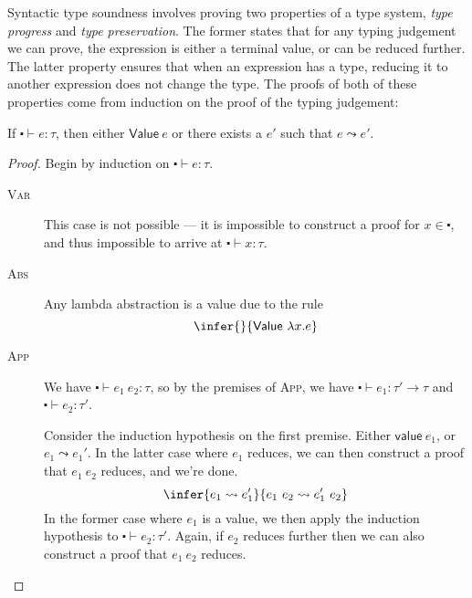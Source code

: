 Syntactic type soundness involves proving two properties of a type
system, \textit{type progress} and \textit{type preservation}.
The former states that for any typing judgement we can prove, the
expression is either a terminal value, or can be reduced further. The
latter property ensures that when an expression has a type, reducing
it to another expression does not change the type.
The proofs of both of these properties come from induction on the
proof of the typing judgement:

\begin{theorem}[Progress]\label{thm:progress}
  If $\centerdot \vdash e : \tau$, then either $\textsf{Value} \ e$ or there exists a $e'$ such that $e \leadsto e'$.
\end{theorem}
\begin{proof}
  Begin by induction on $\centerdot \vdash e : \tau$.
  \begin{description}
  \item[\rm\textsc{Var}] This case is not possible --- it is impossible
    to construct a proof for $x \in \centerdot$, and thus impossible to arrive at
    $\centerdot \vdash x : \tau$.
  \item[\rm\textsc{Abs}] Any lambda abstraction is a value due to the
    rule
    \[\infer{ }{\textsf{Value} \ \lambda x . e}\]
  \item[\rm\textsc{App}] We have $\centerdot \vdash e_1 \ e_2 : \tau$, so by the premises
    of \textsc{App}, we have $\centerdot \vdash e_1 : \tau' \rightarrow \tau$ and $\centerdot \vdash e_2 :
    \tau'$.

    Consider the induction hypothesis on the first premise. Either
    $\textsf{value} \ e_1$, or $e_1 \leadsto e_1'$. In the latter case where
    $e_1$ reduces, we can then construct a proof that $e_1 \ e_2$
    reduces, and we're done.
    \[\infer{e_1 \leadsto e_1'}{e_1 \ e_2 \leadsto e_1' \ e_2}\]
    In the former case where $e_1$ is a value, we then apply the
    induction hypothesis to $\centerdot \vdash e_2 : \tau'$. Again, if $e_2$ reduces
    further then we can also construct a proof that $e_1 \ e_2$
    reduces.
    

\end{description}
\end{proof}
